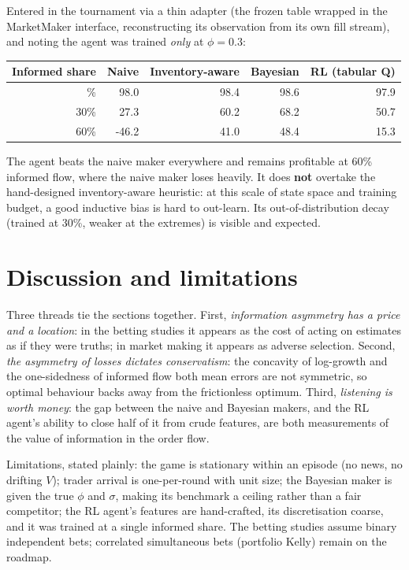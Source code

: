 \documentclass[
  letterpaper,
  DIV=11,
  numbers=noendperiod]{scrartcl}
\newcounter{none} %
\begin{document}
Entered in the tournament via a thin adapter (the frozen table wrapped
in the MarketMaker interface, reconstructing its observation from its
own fill stream), and noting the agent was trained \emph{only} at
\(\phi = 0.3\):

{\def\LTcaptype{none} %
\begin{longtable}[]{@{}rrrrr@{}}
\toprule\noalign{}
Informed share & Naive & Inventory-aware & Bayesian & RL (tabular Q) \\
\midrule\noalign{}
\endhead
\bottomrule\noalign{}
\endlastfoot
0\% & 98.0 & 98.4 & 98.6 & 97.9 \\
30\% & 27.3 & 60.2 & 68.2 & 50.7 \\
60\% & -46.2 & 41.0 & 48.4 & 15.3 \\
\end{longtable}
}

The agent beats the naive maker everywhere and remains profitable at
60\% informed flow, where the naive maker loses heavily. It does
\textbf{not} overtake the hand-designed inventory-aware heuristic: at
this scale of state space and training budget, a good inductive bias is
hard to out-learn. Its out-of-distribution decay (trained at 30\%,
weaker at the extremes) is visible and expected.

\section{Discussion and limitations}\label{discussion-and-limitations}

Three threads tie the sections together. First, \emph{information
asymmetry has a price and a location}: in the betting studies it appears
as the cost of acting on estimates as if they were truths; in market
making it appears as adverse selection. Second, \emph{the asymmetry of
losses dictates conservatism}: the concavity of log-growth and the
one-sidedness of informed flow both mean errors are not symmetric, so
optimal behaviour backs away from the frictionless optimum. Third,
\emph{listening is worth money}: the gap between the naive and Bayesian
makers, and the RL agent's ability to close half of it from crude
features, are both measurements of the value of information in the order
flow.

Limitations, stated plainly: the game is stationary within an episode
(no news, no drifting \(V\)); trader arrival is one-per-round with unit
size; the Bayesian maker is given the true \(\phi\) and \(\sigma\),
making its benchmark a ceiling rather than a fair competitor; the RL
agent's features are hand-crafted, its discretisation coarse, and it was
trained at a single informed share. The betting studies assume binary
independent bets; correlated simultaneous bets (portfolio Kelly) remain
on the roadmap.
\end{document}
